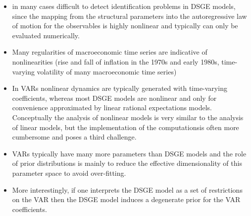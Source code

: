 \documentclass[]{scrartcl}
\begin{document}
\begin{itemize}
\begin{itemize}
	\item in many cases difficult to detect identification problems in DSGE models, since the mapping from the structural parameters into the autoregressive law of motion for the observables is highly nonlinear and typically can only be evaluated numerically.
	\item Many regularities of macroeconomic time series are indicative of nonlinearities (rise and fall of inflation in the 1970s and early 1980s, time-varying volatility of many macroeconomic time series)
	\item In VARs nonlinear dynamics are typically generated with time-varying coefficients, whereas most DSGE models are nonlinear and only for convenience approximated by linear
	rational expectations models. Conceptually the analysis of nonlinear models is very	similar to the analysis of linear models, but the implementation of the computationsis often more cumbersome and poses a third challenge.	
	\item VARs typically have many more parameters than DSGE models and the role of	prior distributions is mainly to reduce the effective dimensionality of this parameter space to avoid over-fitting. 
	\item More interestingly, if one interprets the DSGE model as a set of restrictions on the VAR then the DSGE model induces a degenerate prior for the VAR coefficients.
\end{itemize}

\end{itemize}
\end{document}
